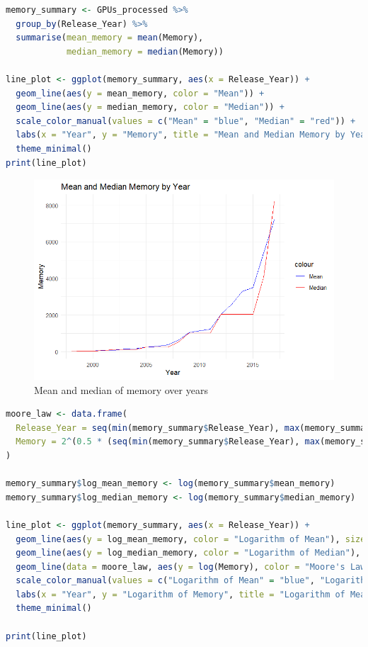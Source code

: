 \begin{lstlisting}[language=R]
memory_summary <- GPUs_processed %>%
  group_by(Release_Year) %>%
  summarise(mean_memory = mean(Memory),
            median_memory = median(Memory))

line_plot <- ggplot(memory_summary, aes(x = Release_Year)) +
  geom_line(aes(y = mean_memory, color = "Mean")) +
  geom_line(aes(y = median_memory, color = "Median")) +
  scale_color_manual(values = c("Mean" = "blue", "Median" = "red")) +
  labs(x = "Year", y = "Memory", title = "Mean and Median Memory by Year") +
  theme_minimal()
print(line_plot)
\end{lstlisting}

\begin{figure}[ht]
  \centering
  \includegraphics[width=1\linewidth]{img/MeaMedMem_Year.png}
  \vspace{1pt}
  \caption{Mean and median of memory over years}
\end{figure}

\begin{lstlisting}[language=R]
moore_law <- data.frame(
  Release_Year = seq(min(memory_summary$Release_Year), max(memory_summary$Release_Year), 1),
  Memory = 2^(0.5 * (seq(min(memory_summary$Release_Year), max(memory_summary$Release_Year), 1) - min(memory_summary$Release_Year - 8)))
)

memory_summary$log_mean_memory <- log(memory_summary$mean_memory)
memory_summary$log_median_memory <- log(memory_summary$median_memory)

line_plot <- ggplot(memory_summary, aes(x = Release_Year)) +
  geom_line(aes(y = log_mean_memory, color = "Logarithm of Mean"), size = 1) +
  geom_line(aes(y = log_median_memory, color = "Logarithm of Median"), size = 1) +
  geom_line(data = moore_law, aes(y = log(Memory), color = "Moore's Law"), size = 1, linetype = "dashed") +
  scale_color_manual(values = c("Logarithm of Mean" = "blue", "Logarithm of Median" = "red", "Moore's Law" = "green4")) +
  labs(x = "Year", y = "Logarithm of Memory", title = "Logarithm of Mean and Median Memory by Year") +
  theme_minimal()

print(line_plot)
\end{lstlisting}

